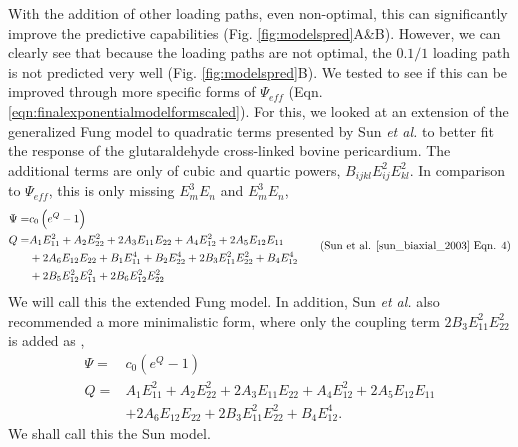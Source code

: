 	With the addition of other loading paths, even non-optimal, this can significantly improve the predictive capabilities (Fig. \ref{fig:modelspred}A\&B). However, we can clearly see that because the loading paths are not optimal, the $0.1/1$ loading path is not predicted very well (Fig. \ref{fig:modelspred}B). We tested to see if this can be improved through more specific forms of $\Psi_{eff}$ (Eqn. \ref{eqn:finalexponentialmodelformscaled}). For this, we looked at an extension of the generalized Fung model to quadratic terms presented by Sun \textit{et al.} \cite{sun_biaxial_2003} to better fit the response of the glutaraldehyde cross-linked bovine pericardium. The additional terms are only of cubic and quartic powers, $B_{ijkl}E_{ij}^2E_{kl}^2$. In comparison to $\Psi_{eff}$, this is only missing $E_m^3E_n$ and $E_m^3E_n$,
\begin{equation}\label{eqn:fullsunmodel}
\begin{aligned}
\Psi	=& c_0 \left(e^{Q} - 1\right) \\
Q		=& A_1 E_{11}^2 + A_2 E_{22}^2 + 2A_3E_{11}E_{22} + A_4 E_{12}^2 + 2A_5E_{12}E_{11}	\\
	&+ 2A_6E_{12}E_{22} + B_1 E_{11}^4 + B_2 E_{22}^4 + 2B_3E_{11}^2E_{22}^2 + B_4 E_{12}^4	\\
    &+ 2B_5E_{12}^2E_{11}^2 + 2B_6E_{12}^2E_{22}^2 
\end{aligned}\tag{Sun et al. \cite{sun_biaxial_2003} Eqn. 4}
\end{equation}
We will call this the extended Fung model. In addition, Sun \textit{et al.} \cite{sun_biaxial_2003} also recommended a more minimalistic form, where only the coupling term $2B_3E_{11}^2E_{22}^2$ is added as , 
\begin{equation}\label{eqn:extendedfung}
\begin{aligned}
\Psi	=& c_0 \left(e^{Q} - 1\right) \\
Q		=& A_1 E_{11}^2 + A_2 E_{22}^2 + 2A_3E_{11}E_{22} + A_4 E_{12}^2 + 2A_5E_{12}E_{11}	\\
	&+ 2A_6E_{12}E_{22} + 2B_3E_{11}^2E_{22}^2 + B_4 E_{12}^4.
\end{aligned}
\end{equation}
We shall call this the Sun model. 

